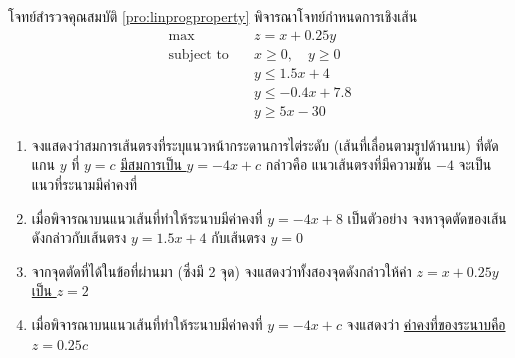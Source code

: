 \begin{example}{โจทย์สำรวจคุณสมบัติ \ref{pro:linprogproperty}}{}
    พิจารณาโจทย์กำหนดการเชิงเส้น
    \begin{align*}
    \max  &\quad z=x+0.25y \\
    \text{subject to} &\quad x\geq0, \quad y\geq0\\
                &\quad y\leq1.5x+4\\
                &\quad y\leq-0.4x+7.8\\
                &\quad y\geq5x-30
    \end{align*}
    \begin{enumerate}
        \item จงแสดงว่าสมการเส้นตรงที่ระบุแนวหน้ากระดานการไต่ระดับ (เส้นที่เลื่อนตามรูปด้านบน) ที่ตัดแกน $y$ ที่ $y = c$ \underline{มีสมการเป็น $y=-4x + c$} กล่าวคือ แนวเส้นตรงที่มีความชัน $-4$ จะเป็นแนวที่ระนามมีค่าคงที่
        \item เมื่อพิจารณาบนแนวเส้นที่ทำให้ระนาบมีค่าคงที่ $y=-4x + 8$ เป็นตัวอย่าง จงหาจุดตัดของเส้นดังกล่าวกับเส้นตรง $y = 1.5x + 4$ กับเส้นตรง $y=0$
        \item จากจุดตัดที่ได้ในข้อที่ผ่านมา (ซึ่งมี 2 จุด) จงแสดงว่าทั้งสองจุดดังกล่าวให้ค่า $z=x + 0.25y$ \underline{เป็น $z = 2$}
        \item เมื่อพิจารณาบนแนวเส้นที่ทำให้ระนาบมีค่าคงที่ $y=-4x + c$ จงแสดงว่า \underline{ค่าคงที่ของระนาบคือ $z = 0.25c$}
    \end{enumerate}
\end{example}

